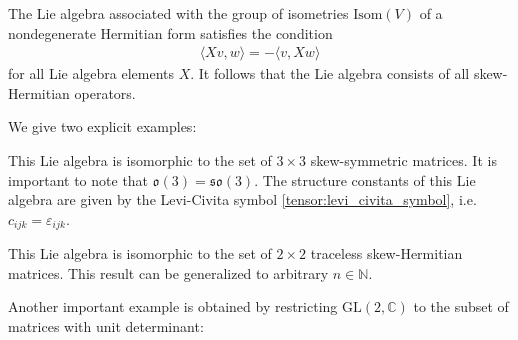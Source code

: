     \begin{example}[Isometries]
        The Lie algebra associated with the group of isometries $\text{Isom}(V)$ of a nondegenerate Hermitian form satisfies the condition
        \begin{gather}
            \label{lie:lie_isometry}
            \langle Xv,w \rangle = -\langle v,Xw \rangle
        \end{gather}
        for all Lie algebra elements $X$. It follows that the Lie algebra consists of all skew-Hermitian operators.
    \end{example}
    We give two explicit examples:
    \begin{example}\label{lie:so3}
        This Lie algebra is isomorphic to the set of $3\times3$ skew-symmetric matrices. It is important to note that $\mathfrak{o}(3)=\mathfrak{so}(3)$. The structure constants of this Lie algebra are given by the Levi-Civita symbol \ref{tensor:levi_civita_symbol}, i.e. $c_{ijk}=\varepsilon_{ijk}$.
    \end{example}
    \begin{example}
        This Lie algebra is isomorphic to the set of $2\times2$ traceless skew-Hermitian matrices. This result can be generalized to arbitrary $n\in\mathbb{N}$.
    \end{example}
    Another important example is obtained by restricting $\text{GL}(2, \mathbb{C})$ to the subset of matrices with unit determinant:
